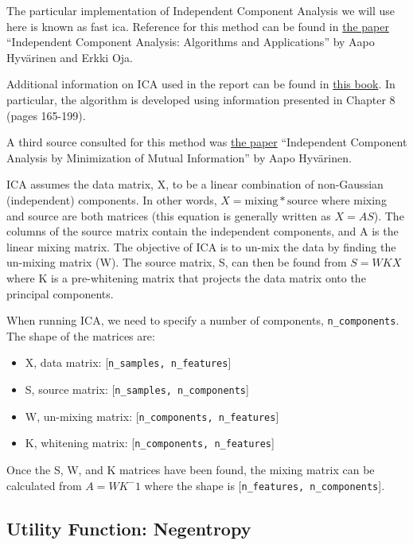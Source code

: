 \documentclass[12pt]{article}
\providecommand{\tightlist}{%
      \setlength{\itemsep}{0pt}\setlength{\parskip}{0pt}}
\begin{document}
The particular implementation of Independent Component Analysis we will
use here is known as fast ica. Reference for this method can be found in
\href{https://www.cs.helsinki.fi/u/ahyvarin/papers/NN00new.pdf}{the
paper} ``Independent Component Analysis: Algorithms and Applications''
by Aapo Hyvärinen and Erkki Oja.

Additional information on ICA used in the report can be found in
\href{https://www.cs.helsinki.fi/u/ahyvarin/papers/bookfinal_ICA.pdf}{this
book}. In particular, the algorithm is developed using information
presented in Chapter 8 (pages 165-199).

A third source consulted for this method was
\href{http://www.ccs.neu.edu/home/jaa/CS6800.11F/Topics/Papers/Hyvarinen97.pdf}{the
paper} ``Independent Component Analysis by Minimization of Mutual
Information'' by Aapo Hyvärinen.

ICA assumes the data matrix, X, to be a linear combination of
non-Gaussian (independent) components. In other words,
\(X = \text{mixing} * \text{source}\) where mixing and source are both
matrices (this equation is generally written as \(X = AS\)). The columns
of the source matrix contain the independent components, and A is the
linear mixing matrix. The objective of ICA is to un-mix the data by
finding the un-mixing matrix (W). The source matrix, S, can then be
found from \(S = W K X\) where K is a pre-whitening matrix that projects
the data matrix onto the principal components.

When running ICA, we need to specify a number of components,
\texttt{n\_components}. The shape of the matrices are:

\begin{itemize}
\tightlist
\item
  X, data matrix: {[}\texttt{n\_samples,\ n\_features}{]}
\item
  S, source matrix: {[}\texttt{n\_samples,\ n\_components}{]}
\item
  W, un-mixing matrix: {[}\texttt{n\_components,\ n\_features}{]}
\item
  K, whitening matrix: {[}\texttt{n\_components,\ n\_features}{]}
\end{itemize}

Once the S, W, and K matrices have been found, the mixing matrix can be
calculated from \(A = WK^-1\) where the shape is
{[}\texttt{n\_features,\ n\_components}{]}.

    \hypertarget{utility-function-negentropy}{%
\subsection{Utility Function:
Negentropy}\label{utility-function-negentropy}}
\end{document}
